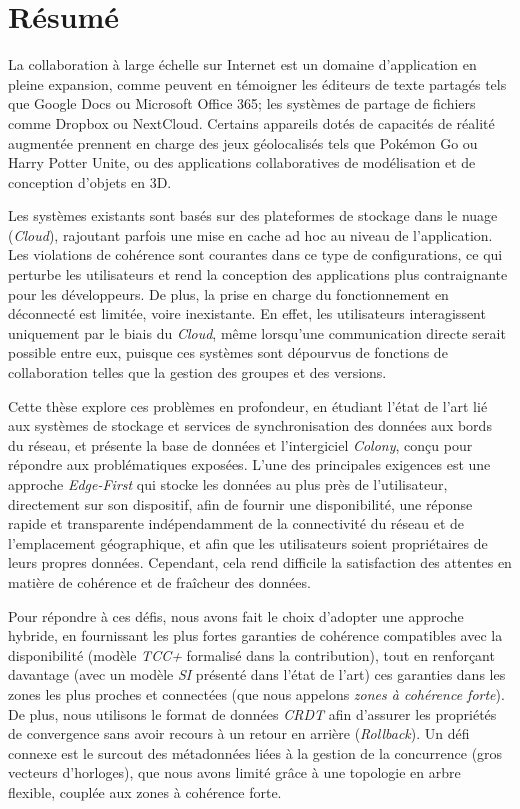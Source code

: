 %
\chapter{Résumé}
\label{appendix:resume-fr}

La collaboration à large échelle sur Internet est un domaine d'application 
en pleine expansion,
comme peuvent en témoigner les éditeurs de texte partagés tels que Google Docs
ou Microsoft Office 365; 
les systèmes de partage de fichiers comme Dropbox ou NextCloud.
Certains appareils dotés de capacités de réalité augmentée prennent en charge des 
jeux géolocalisés tels que Pokémon Go ou Harry Potter Unite,
ou des applications collaboratives de modélisation et de conception d'objets 
en 3D.

Les systèmes existants sont basés sur des plateformes de stockage dans le nuage
(\textit{Cloud}),
rajoutant parfois une mise en cache ad hoc au niveau de l'application.
Les violations de cohérence sont courantes dans ce type de configurations,
ce qui perturbe les utilisateurs et rend la conception des applications plus 
contraignante pour les développeurs.
De plus, la prise en charge du fonctionnement en déconnecté est limitée,
voire inexistante.
En effet, les utilisateurs interagissent uniquement par le biais du 
\textit{Cloud},
même lorsqu'une communication directe serait possible entre eux,
puisque ces systèmes sont dépourvus de fonctions de collaboration telles que 
la gestion des groupes et des versions.

Cette thèse explore ces problèmes en profondeur,
en étudiant l'état de l'art lié aux systèmes de stockage 
et services de synchronisation des données aux bords du réseau,
et présente la base de données et l'intergiciel \textit{Colony},
conçu pour répondre aux problématiques exposées.
L'une des principales exigences est une approche \textit{Edge-First}
qui stocke les données au plus près de l'utilisateur, 
directement sur son dispositif,
afin de fournir une disponibilité,
une réponse rapide et transparente indépendamment de la connectivité du réseau
et de l'emplacement géographique,
et afin que les utilisateurs soient propriétaires de leurs propres données.
Cependant, cela rend difficile la satisfaction des attentes en matière
de cohérence et de fraîcheur des données.

Pour répondre à ces défis,
nous avons fait le choix d'adopter une approche hybride,
en fournissant les plus fortes garanties de cohérence compatibles avec la 
disponibilité (modèle \textit{TCC+} formalisé dans la contribution),
tout en renforçant davantage (avec un modèle \textit{SI} présenté 
dans l'état de l'art) ces garanties dans les zones les plus proches 
et connectées (que nous appelons \textit{zones à cohérence forte}).
De plus, nous utilisons le format de données \textit{CRDT} afin d'assurer 
les propriétés de convergence sans avoir recours à un retour en arrière
(\textit{Rollback}).
Un défi connexe est le surcout des métadonnées liées à la gestion de la 
concurrence (gros vecteurs d'horloges),
que nous avons limité grâce à une topologie en arbre flexible,
couplée aux zones à cohérence forte.

